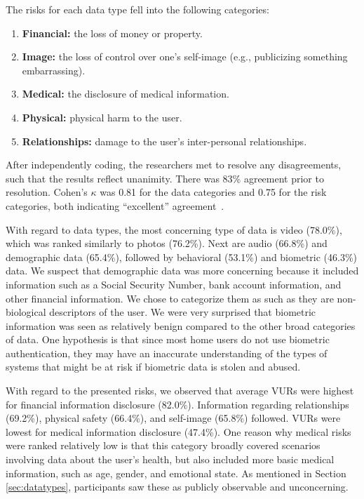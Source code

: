 The risks for each data type fell into the following categories:
\begin{enumerate}[topsep=0pt,itemsep=-1ex,partopsep=1ex,parsep=1ex]
\item {\bf Financial:} the loss of money or property.
\item {\bf Image:} the loss of control over one's self-image (e.g., publicizing something embarrassing).
\item {\bf Medical:} the disclosure of medical information.
\item {\bf Physical:} physical harm to the user.
\item {\bf Relationships:} damage to the user's inter-personal relationships.
\end{enumerate}

After independently coding, the researchers met to resolve any disagreements, such that the results reflect unanimity. There was  83\% agreement prior to resolution. Cohen's $\kappa$ was 0.81 for the data categories and 0.75 for the  risk categories, both indicating ``excellent'' agreement~\cite{Fleiss2003}. 

With regard to data types, the most concerning type of data is video (78.0\%), which was ranked similarly to photos (76.2\%). Next are audio (66.8\%) and demographic data (65.4\%), followed by behavioral (53.1\%) and biometric (46.3\%) data. We suspect that demographic data was more concerning because it included information such as a Social Security Number, bank account information, and other financial information. We chose to categorize them as such as they are non-biological descriptors of the user. We were very surprised that biometric information was seen as relatively benign compared to the other broad categories of data. One hypothesis is that since most home users do not use biometric authentication, they may have an inaccurate understanding of the types of systems that might be at risk if biometric data is stolen and abused.

With regard to the presented risks, we observed that average VURs were highest for financial information disclosure (82.0\%). Information regarding relationships (69.2\%), physical safety (66.4\%), and self-image (65.8\%) followed. VURs were lowest for medical information disclosure (47.4\%). One reason why medical risks were ranked relatively low is that this category broadly covered scenarios involving data about the user's health, but also included more basic medical information, such as age, gender, and emotional state. As mentioned in Section \ref{sec:datatypes}, participants saw these as publicly observable and unconcerning.


